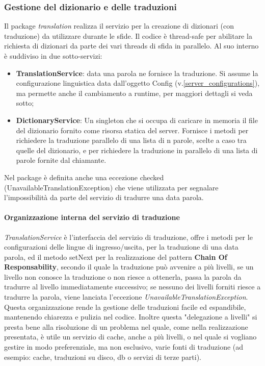 \documentclass{article}
\begin{document}
    \subsubsection{Gestione del dizionario e delle traduzioni}\label{server_translations}
    Il package \emph{translation} realizza il servizio per la creazione di dizionari (con traduzione) da utilizzare durante le sfide. Il codice è thread-safe per abilitare la richiesta di dizionari da parte dei vari threads di sfida in parallelo. Al suo interno è suddiviso in due sotto-servizi:
    \begin{itemize}
        \item \textbf{TranslationService}: data una parola ne fornisce la traduzione. Si assume la configurazione linguistica data dall'oggetto Config (v.\ref{server_configurations}), ma permette anche il cambiamento a runtime, per maggiori dettagli si veda sotto;
        \item \textbf{DictionaryService}: Un singleton che si occupa di caricare in memoria il file del dizionario fornito come risorsa statica del server. Fornisce i metodi per richiedere la traduzione parallelo di una lista di n parole, scelte a caso tra quelle del dizionario, e per richiedere la traduzione in parallelo di una lista di parole fornite dal chiamante.
    \end{itemize}

    Nel package è definita anche una eccezione checked (UnavailableTranslationException) che viene utilizzata per segnalare l'impossibilità da parte del servizio di tradurre una data parola.

    \paragraph{Organizzazione interna del servizio di traduzione} \emph{TranslationService} è l'interfaccia del servizio di traduzione, offre i metodi per le configurazioni delle lingue di ingresso/uscita, per la traduzione di una data parola, ed il metodo setNext per la realizzazione del pattern \textbf{Chain Of Responsability}, secondo il quale la traduzione può avvenire a più livelli, se un livello non conosce la traduzione o non riesce a ottenerla, passa la parola da tradurre al livello immediatamente successivo; se nessuno dei livelli forniti riesce a tradurre la parola, viene lanciata l'eccezione \emph{UnavailableTranslationException}. Questa organizzazione rende la gestione delle traduzioni facile ed espandibile, mantenendo chiarezza e pulizia nel codice. Inoltre questa "delegazione a livelli" si presta bene alla risoluzione di un problema nel quale, come nella realizzazione presentata, è utile un servizio di cache, anche a più livelli, o nel quale si vogliano gestire in modo preferenziale, ma non esclusivo, varie fonti di traduzione (ad esempio: cache, traduzioni su disco, db o servizi di terze parti).
\end{document}

